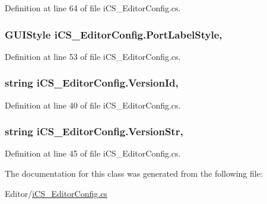 Definition at line 64 of file i\+C\+S\+\_\+\+Editor\+Config.\+cs.

\hypertarget{classi_c_s___editor_config_a5ae02d84c8c84987a305e30ae7035d97}{
\subsubsection[{Port\+Label\+Style}]{\setlength{\rightskip}{0pt plus 5cm}G\+U\+I\+Style i\+C\+S\+\_\+\+Editor\+Config.\+Port\+Label\+Style\hspace{0.3cm}{\ttfamily [static]}, {\ttfamily [get]}}}\label{classi_c_s___editor_config_a5ae02d84c8c84987a305e30ae7035d97}


Definition at line 53 of file i\+C\+S\+\_\+\+Editor\+Config.\+cs.

\hypertarget{classi_c_s___editor_config_aced7bf4feca11c6c231bfe972703d0e3}{
\subsubsection[{Version\+Id}]{\setlength{\rightskip}{0pt plus 5cm}string i\+C\+S\+\_\+\+Editor\+Config.\+Version\+Id\hspace{0.3cm}{\ttfamily [static]}, {\ttfamily [get]}}}\label{classi_c_s___editor_config_aced7bf4feca11c6c231bfe972703d0e3}


Definition at line 40 of file i\+C\+S\+\_\+\+Editor\+Config.\+cs.

\hypertarget{classi_c_s___editor_config_ab76b11356b97aede178ca2ffee836e7b}{
\subsubsection[{Version\+Str}]{\setlength{\rightskip}{0pt plus 5cm}string i\+C\+S\+\_\+\+Editor\+Config.\+Version\+Str\hspace{0.3cm}{\ttfamily [static]}, {\ttfamily [get]}}}\label{classi_c_s___editor_config_ab76b11356b97aede178ca2ffee836e7b}


Definition at line 45 of file i\+C\+S\+\_\+\+Editor\+Config.\+cs.



The documentation for this class was generated from the following file\+:\begin{DoxyCompactItemize}
\item 
Editor/\hyperlink{i_c_s___editor_config_8cs}{i\+C\+S\+\_\+\+Editor\+Config.\+cs}\end{DoxyCompactItemize}
